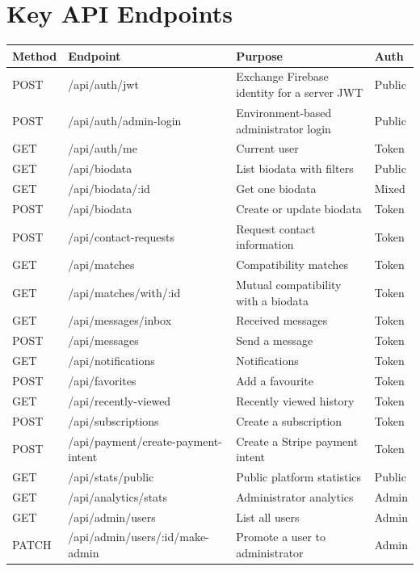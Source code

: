 \documentclass[12pt,a4paper]{report}
\begin{document}
\section{Key API Endpoints}
\label{app:endpoints}
\begin{table}[H]
\centering
\small
\begin{tabularx}{\textwidth}{l l X l}
\toprule
\textbf{Method} & \textbf{Endpoint} & \textbf{Purpose} & \textbf{Auth} \\
\midrule
POST   & /api/auth/jwt                & Exchange Firebase identity for a server JWT & Public \\
POST   & /api/auth/admin-login        & Environment-based administrator login        & Public \\
GET    & /api/auth/me                 & Current user                                & Token \\
GET    & /api/biodata                 & List biodata with filters                   & Public \\
GET    & /api/biodata/:id             & Get one biodata                             & Mixed \\
POST   & /api/biodata                 & Create or update biodata                    & Token \\
POST   & /api/contact-requests        & Request contact information                 & Token \\
GET    & /api/matches                 & Compatibility matches                       & Token \\
GET    & /api/matches/with/:id        & Mutual compatibility with a biodata         & Token \\
GET    & /api/messages/inbox          & Received messages                           & Token \\
POST   & /api/messages                & Send a message                              & Token \\
GET    & /api/notifications           & Notifications                               & Token \\
POST   & /api/favorites               & Add a favourite                             & Token \\
GET    & /api/recently-viewed         & Recently viewed history                     & Token \\
POST   & /api/subscriptions           & Create a subscription                       & Token \\
POST   & /api/payment/create-payment-intent & Create a Stripe payment intent        & Token \\
GET    & /api/stats/public            & Public platform statistics                  & Public \\
GET    & /api/analytics/stats         & Administrator analytics                     & Admin \\
GET    & /api/admin/users             & List all users                              & Admin \\
PATCH  & /api/admin/users/:id/make-admin & Promote a user to administrator           & Admin \\
\bottomrule
\end{tabularx}
\end{table}
\end{document}

